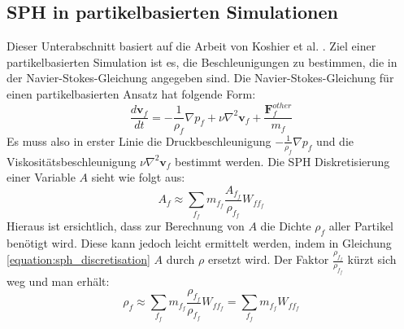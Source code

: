 \documentclass{scrreprt}
\begin{document}
\subsection{SPH in partikelbasierten Simulationen}
Dieser Unterabschnitt basiert auf die Arbeit von Koshier et al. \cite{koschier_smoothed_2020}.
Ziel einer partikelbasierten Simulation ist es, die Beschleunigungen zu bestimmen, die in der Navier-Stokes-Gleichung angegeben sind.
Die Navier-Stokes-Gleichung für einen partikelbasierten Ansatz hat folgende Form:
\begin{equation}
    \frac{d\textbf{v}_f}{dt} = -\frac{1}{\rho_f} \nabla p_f + \nu \nabla^2 \textbf{v}_f + \frac{\textbf{F}_f^{other}}{m_f}
\end{equation}
Es muss also in erster Linie die Druckbeschleunigung $-\frac{1}{\rho_f} \nabla p_f$ und
die Viskositätsbeschleunigung $\nu \nabla^2 \textbf{v}_f$ bestimmt werden.
Die SPH Diskretisierung einer Variable $A$ sieht wie folgt aus:
\begin{equation}
    \label{equation:sph_discretisation}
    A_f \approx \sum_{f_f} m_{f_f} \frac{A_{f_f}}{\rho_{f_f}} W_{ff_f}
\end{equation}
Hieraus ist ersichtlich, dass zur Berechnung von $A$ die Dichte $\rho_f$ aller Partikel benötigt wird.
Diese kann jedoch leicht ermittelt werden, indem in Gleichung \ref{equation:sph_discretisation} $A$ durch $\rho$ ersetzt wird.
Der Faktor $\frac{\rho_{f_f}}{\rho_{f_f}}$ kürzt sich weg und man erhält:
\begin{equation}
    \rho_f \approx \sum_{f_f} m_{f_f} \frac{\rho_{f_f}}{\rho_{f_f}} W_{ff_f} = \sum_{f_f} m_{f_f} W_{ff_f}
\end{equation}
\end{document}
